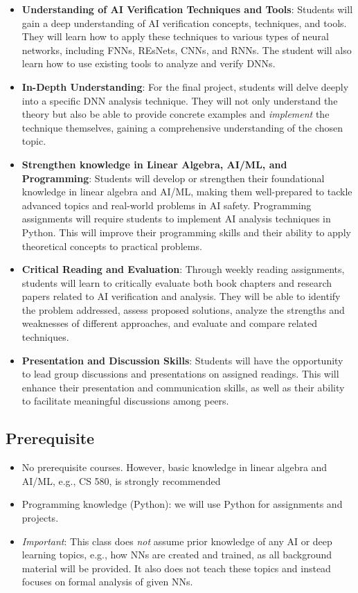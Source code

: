 \documentclass[11pt]{article}
\begin{document}
\begin{itemize}
\item \textbf{Understanding of AI Verification Techniques and Tools}: Students will gain a deep understanding of AI verification concepts, techniques, and tools. They will learn how to apply these techniques to various types of neural networks, including FNNs, REsNets, CNNs, and RNNs.  The student will also learn how to use existing tools to analyze and verify DNNs.

\item \textbf{In-Depth Understanding}: For the final project, students will delve deeply into a specific DNN analysis technique. They will not only understand the theory but also be able to provide concrete examples and \emph{implement} the technique themselves, gaining a comprehensive understanding of the chosen topic.  

\item \textbf{Strengthen knowledge in Linear Algebra, AI/ML, and Programming}: Students will develop or strengthen their foundational knowledge in linear algebra and AI/ML, making them well-prepared to tackle advanced topics and real-world problems in AI safety. 
Programming assignments will require students to implement AI analysis techniques in Python. This will improve their programming skills and their ability to apply theoretical concepts to practical problems.


\item \textbf{Critical Reading and Evaluation}: Through weekly reading assignments, students will learn to critically evaluate both book chapters and research papers related to AI verification and analysis. They will be able to identify the problem addressed, assess proposed solutions, analyze the strengths and weaknesses of different approaches, and evaluate and compare related techniques.

\item \textbf{Presentation and Discussion Skills}: Students will have the opportunity to lead group discussions and presentations on assigned readings. This will enhance their presentation and communication skills, as well as their ability to facilitate meaningful discussions among peers.

\end{itemize}



\subsection{Prerequisite}
\begin{itemize}
\item No prerequisite courses. However, basic knowledge in linear algebra and AI/ML, e.g., CS 580, is strongly recommended
\item Programming knowledge (Python): we will use Python for assignments and projects.
\item \emph{Important}: This class does \emph{not} assume prior knowledge of any AI or deep learning topics, e.g., how NNs are created and trained, as all background material will be provided. It also does not teach these topics and instead focuses on formal analysis of given NNs.
\end{itemize}
\end{document}

